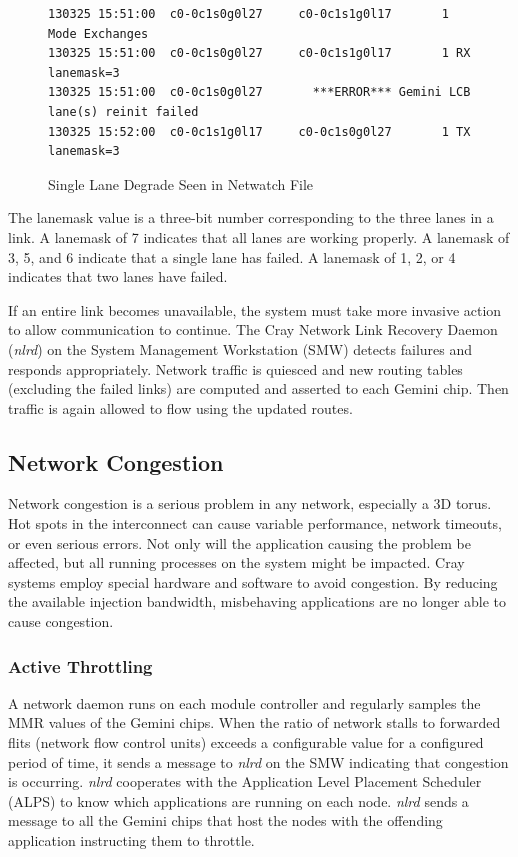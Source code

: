 \documentclass[10pt, conference, compsocconf]{IEEEtran}
\begin{document}
\begin{figure}[ht]
  \begin{verbatim}
130325 15:51:00  c0-0c1s0g0l27     c0-0c1s1g0l17       1 Mode Exchanges                       
130325 15:51:00  c0-0c1s0g0l27     c0-0c1s1g0l17       1 RX lanemask=3                        
130325 15:51:00  c0-0c1s0g0l27       ***ERROR*** Gemini LCB lane(s) reinit failed
130325 15:52:00  c0-0c1s1g0l17     c0-0c1s0g0l27       1 TX lanemask=3                       
  \end{verbatim}
  \caption{Single Lane Degrade Seen in Netwatch File}\label{fig:lanedegrade}
\end{figure}

The lanemask value is a three-bit number corresponding to the three lanes in a
link.  A lanemask of 7 indicates that all lanes are working properly.  A
lanemask of 3, 5, and 6 indicate that a single lane has failed.  A lanemask of
1, 2, or 4 indicates that two lanes have failed.

If an entire link becomes unavailable, the system must take more invasive
action to allow communication to continue.  The Cray Network Link Recovery
Daemon (\emph{nlrd}) on the System Management Workstation (SMW) detects failures and
responds appropriately.  Network traffic is quiesced and new routing tables
(excluding the failed links) are computed and asserted to each Gemini chip.
Then traffic is again allowed to flow using the updated routes.

\subsection{Network Congestion}

Network congestion is a serious problem in any network, especially a 3D torus.
Hot spots in the interconnect can cause variable performance, network timeouts,
or even serious errors.  Not only will the application causing the problem be
affected, but all running processes on the system might be impacted.  Cray
systems employ special hardware and software to avoid congestion.  By reducing
the available injection bandwidth, misbehaving applications are no longer able
to cause congestion.

\subsubsection{Active Throttling}

A network daemon runs on each module controller and regularly samples the MMR
values of the Gemini chips.  When the ratio of network stalls to forwarded
flits (network flow control units) exceeds a configurable value for a
configured period of time, it sends a message to \emph{nlrd} on the SMW indicating
that congestion is occurring.  \emph{nlrd} cooperates with the Application Level
Placement Scheduler (ALPS) to know which applications are running on each node.
\emph{nlrd} sends a message to all the Gemini chips that host the nodes with the
offending application instructing them to throttle.
\end{document}
